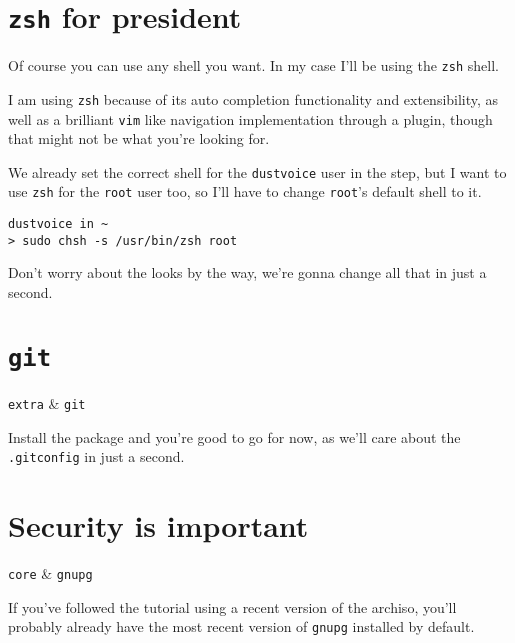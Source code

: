 \documentclass[10pt]{dustdoc}
\begin{document}
\section{\texttt{zsh} for president}%
\label{sec:zsh-for-president}

Of course you can use any shell you want.
In my case I’ll be using the \texttt{zsh} shell.

\begin{NOTE}
    I am using \texttt{zsh} because of its auto completion functionality and extensibility, as well as a brilliant \texttt{vim} like navigation implementation through a plugin, though that might not be what you’re looking for.
\end{NOTE}

We already set the correct shell for the \texttt{dustvoice} user in the  step, but I want to use \texttt{zsh} for the \texttt{root} user too, so I’ll have to change \texttt{root}'s default shell to it.

\begin{verbatim}
dustvoice in ~
> sudo chsh -s /usr/bin/zsh root
\end{verbatim}

Don’t worry about the looks by the way, we’re gonna change all that in just a second.

\section{\texttt{git}}%
\label{sec:git}

\begin{pkgtable}
    \texttt{extra} & \texttt{git} \\
\end{pkgtable}

Install the package and you’re good to go for now, as we’ll care about the \texttt{.gitconfig} in just a second.

\section{Security is important}%
\label{sec:security-is-important}

\begin{pkgtable}
    \texttt{core} & \texttt{gnupg} \\
\end{pkgtable}

If you’ve followed the tutorial using a recent version of the archiso, you’ll probably already have the most recent version of \texttt{gnupg} installed by default.
\end{document}
